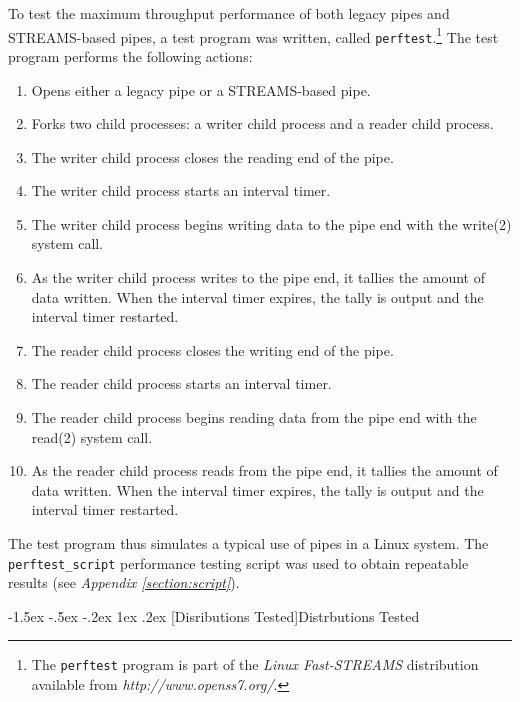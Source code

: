 \documentclass[letterpaper,final,notitlepage,twocolumn,10pt,twoside]{article}
\makeatletter
\renewcommand\subsection{\@startsection{subsection}{2}{\z@}%
                                     {-1.5ex \@plus -.5ex \@minus -.2ex}%
                                     {1ex \@plus .2ex}%
                                     {\normalfont\normalsize\bfseries}}
\makeatother
\begin{document}
To test the maximum throughput performance of both legacy pipes and
STREAMS-based pipes, a test program was written, called
\texttt{perftest}.\footnote{The \texttt{perftest} program is part of the
\textsl{Linux Fast-STREAMS} distribution available from
\textit{http://www.openss7.org/}.} The test program performs the following
actions:

\begin{enumerate}

\item Opens either a legacy pipe or a STREAMS-based pipe.

\item Forks two child processes: a writer child process and a reader child
process.

\item The writer child process closes the reading end of the pipe.

\item The writer child process starts an interval timer.

\item The writer child process begins writing data to the pipe end with the
write(2) system call.

\item As the writer child process writes to the pipe end, it tallies the
amount of data written.  When the interval timer expires, the tally is output
and the interval timer restarted.

\item The reader child process closes the writing end of the pipe.

\item The reader child process starts an interval timer.

\item The reader child process begins reading data from the pipe end with the
read(2) system call.

\item As the reader child process reads from the pipe end, it tallies the
amount of data written.  When the interval timer expires, the tally is output
and the interval timer restarted.

\end{enumerate}

The test program thus simulates a typical use of pipes in a Linux system.  The
\texttt{perftest\_script} performance testing script was used to obtain
repeatable results (see \textit{Appendix \ref{section:script}}).

\subsection[Disributions Tested]{Distrbutions Tested}
\end{document}
